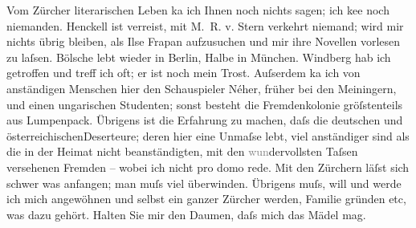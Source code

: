 \begin{ledgroupsized}[t]{13cm}
           \pstart
           Vom Zürcher literarischen Leben ka{\geminationn} ich Ihnen noch nichts sagen; ich ke{\geminationn}e noch niemanden. Henckell ist verreist, mit M. R. v.
                  Stern verkehrt niemand; wird mir nichts übrig bleiben, als Ilse Frapan aufzusuchen und mir ihre Novellen
               vorlesen zu laſsen. Bölsche lebt wieder in Berlin, Halbe in München. Windberg hab ich getroffen und treff ich oft; er ist noch mein
               Trost. Auſserdem ka{\geminationn} ich von anständigen Menschen hier
               den Schauspieler Néher, früher bei den Meiningern, und einen ungarischen Studenten; sonst besteht die Fremdenkolonie gröſstenteils aus Lumpenpack.
               Übrigens ist die Erfahrung zu machen, daſs die deutschen und österreichischenDeserteure; deren hier eine Unmaſse lebt, viel
               anständiger sind als die in der Heimat nicht beanständigten, mit den
                  \textcolor{gray}{wun}dervollsten Taſsen versehenen Fremden – wobei ich nicht pro
               domo rede. Mit den Zürchern läſst sich schwer was
               anfangen; man muſs viel überwinden. Übrigens muſs, will und werde ich mich angewöhnen
               und selbst ein ganzer Zürcher werden, Familie
               gründen etc, was dazu gehört. Halten Sie mir den Daumen, daſs mich das Mädel mag.

\end{ledgroupsized}
